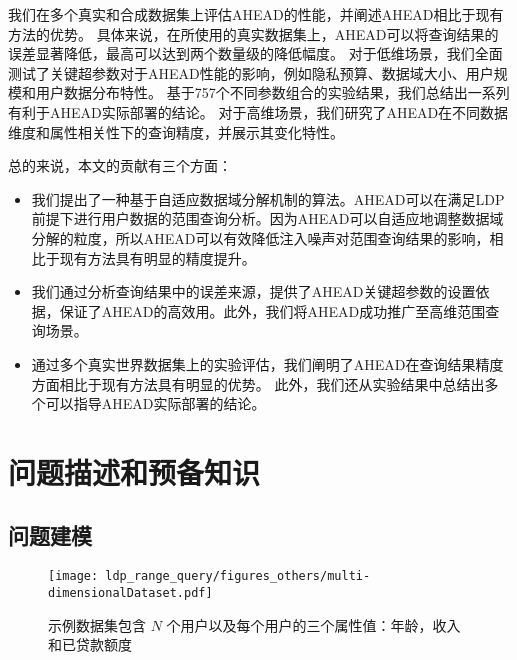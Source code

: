 我们在多个真实和合成数据集上评估AHEAD的性能，并阐述AHEAD相比于现有方法的优势。
具体来说，在所使用的真实数据集上，AHEAD可以将查询结果的误差显著降低，最高可以达到两个数量级的降低幅度。
对于低维场景，我们全面测试了关键超参数对于AHEAD性能的影响，例如隐私预算、数据域大小、用户规模和用户数据分布特性。
基于757个不同参数组合的实验结果，我们总结出一系列有利于AHEAD实际部署的结论。
对于高维场景，我们研究了AHEAD在不同数据维度和属性相关性下的查询精度，并展示其变化特性。

总的来说，本文的贡献有三个方面：
\begin{itemize}
    \item 我们提出了一种基于自适应数据域分解机制的算法。AHEAD可以在满足LDP前提下进行用户数据的范围查询分析。因为AHEAD可以自适应地调整数据域分解的粒度，所以AHEAD可以有效降低注入噪声对范围查询结果的影响，相比于现有方法具有明显的精度提升。
    \item 我们通过分析查询结果中的误差来源，提供了AHEAD关键超参数的设置依据，保证了AHEAD的高效用。此外，我们将AHEAD成功推广至高维范围查询场景。
    \item 通过多个真实世界数据集上的实验评估，我们阐明了AHEAD在查询结果精度方面相比于现有方法具有明显的优势。
    此外，我们还从实验结果中总结出多个可以指导AHEAD实际部署的结论。
\end{itemize}


\section{问题描述和预备知识}

\subsection{问题建模}
\begin{figure}[h]
    \centering
    \texttt{[image: ldp\_range\_query/figures\_others/multi-dimensionalDataset.pdf]}
    \vspace{-0.2cm}
    \caption{示例数据集包含 $N$ 个用户以及每个用户的三个属性值：年龄，收入和已贷款额度} 
    \label{Example dataset}
    \vspace{-0.3cm}
\end{figure}

